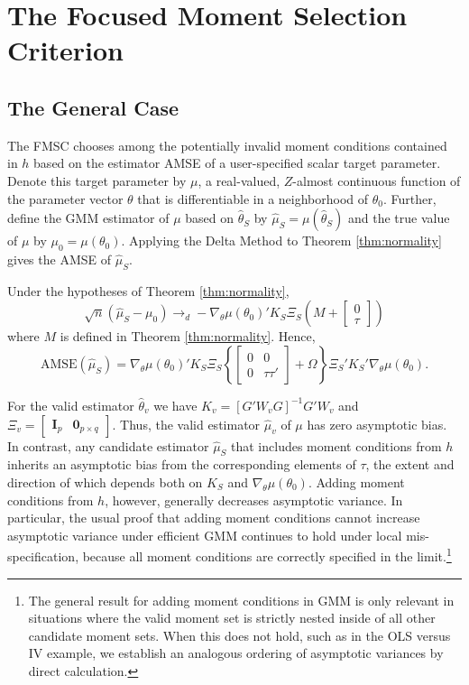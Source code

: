 \section{The Focused Moment Selection Criterion}
\label{sec:FMSC}

\subsection{The General Case}
The FMSC chooses among the potentially invalid moment conditions contained in $h$ based on the estimator AMSE of a user-specified scalar target parameter.
Denote this target parameter by $\mu$, a real-valued, $Z$-almost continuous function of the parameter vector $\theta$ that is differentiable in a neighborhood of $\theta_0$. 
Further, define the GMM estimator of $\mu$ based on $\widehat{\theta}_S$ by $\widehat{\mu}_S = \mu(\widehat{\theta}_S)$ and the true value of $\mu$ by $\mu_0 = \mu(\theta_0)$. 
Applying the Delta Method to Theorem \ref{thm:normality} gives the AMSE of $\widehat{\mu}_S$.

\begin{cor}
\label{cor:target}
Under the hypotheses of Theorem \ref{thm:normality}, 
$$\sqrt{n}\left(\widehat{\mu}_S - \mu_0\right)\rightarrow_d-\nabla_\theta\mu(\theta_0)'K_S \Xi_S \left(M +  \left[\begin{array}
	{c} 0 \\ \tau
\end{array} \right]\right)$$ 
where $M$ is defined in Theorem \ref{thm:normality}.
Hence,
	$$\mbox{AMSE}\left(\widehat{\mu}_S\right) = \nabla_\theta\mu(\theta_0)'K_S \Xi_S \left\{\left[\begin{array}{cc}0&0\\0&\tau\tau'\end{array}\right] + \Omega\right\}\Xi_S'K_S'\nabla_\theta\mu(\theta_0).$$
\end{cor}

For the valid estimator $\widehat{\theta}_v$ we have $K_v = \left[G'W_{v}G\right]^{-1}G' W_{v}$ and $\Xi_v =\left[\begin{array}{cc} \mathbf{I}_p& \mathbf{0}_{p\times q} \end{array} \right]$. 
Thus, the valid estimator $\widehat{\mu}_v$ of $\mu$ has zero asymptotic bias. 
In contrast, any candidate estimator $\widehat{\mu}_S$ that includes moment conditions from $h$ inherits an asymptotic bias from the corresponding elements of $\tau$, the extent and direction of which depends both on $K_S$ and $\nabla_\theta\mu(\theta_0)$. 
Adding moment conditions from $h$, however, generally decreases asymptotic variance. 
In particular, the usual proof that adding moment conditions cannot increase asymptotic variance under efficient GMM \citep[see for example][ch.\ 6]{Hallbook} continues to hold under local mis-specification, because all moment conditions are correctly specified in the limit.\footnote{The general result for adding moment conditions in GMM is only relevant in situations where the valid moment set is strictly nested inside of all other candidate moment sets. When this does not hold, such as in the OLS versus IV example, we establish an analogous ordering of asymptotic variances by direct calculation.} 

